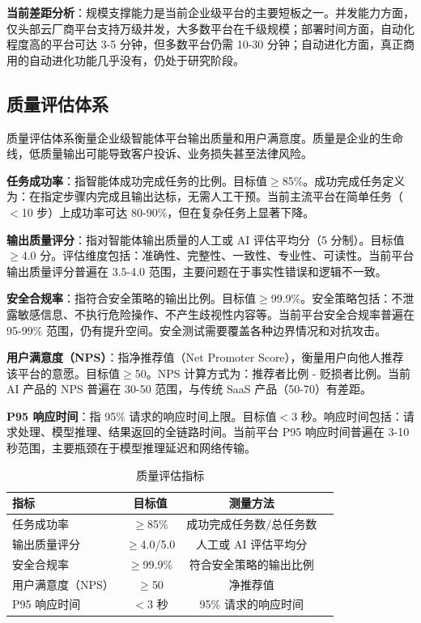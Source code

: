 \documentclass[12pt,a4paper]{article}
\begin{document}
\textbf{当前差距分析}：规模支撑能力是当前企业级平台的主要短板之一。并发能力方面，仅头部云厂商平台支持万级并发，大多数平台在千级规模；部署时间方面，自动化程度高的平台可达 3-5 分钟，但多数平台仍需 10-30 分钟；自动进化方面，真正商用的自动进化功能几乎没有，仍处于研究阶段。

\subsection{质量评估体系}

质量评估体系衡量企业级智能体平台输出质量和用户满意度。质量是企业的生命线，低质量输出可能导致客户投诉、业务损失甚至法律风险。

\textbf{任务成功率}：指智能体成功完成任务的比例。目标值$\geq$85\%。成功完成任务定义为：在指定步骤内完成且输出达标，无需人工干预。当前主流平台在简单任务（$<$10 步）上成功率可达 80-90\%，但在复杂任务上显著下降。

\textbf{输出质量评分}：指对智能体输出质量的人工或 AI 评估平均分（5 分制）。目标值$\geq$4.0 分。评估维度包括：准确性、完整性、一致性、专业性、可读性。当前平台输出质量评分普遍在 3.5-4.0 范围，主要问题在于事实性错误和逻辑不一致。

\textbf{安全合规率}：指符合安全策略的输出比例。目标值$\geq$99.9\%。安全策略包括：不泄露敏感信息、不执行危险操作、不产生歧视性内容等。当前平台安全合规率普遍在 95-99\% 范围，仍有提升空间。安全测试需要覆盖各种边界情况和对抗攻击。

\textbf{用户满意度（NPS）}：指净推荐值（Net Promoter Score），衡量用户向他人推荐该平台的意愿。目标值$\geq$50。NPS 计算方式为：推荐者比例 - 贬损者比例。当前 AI 产品的 NPS 普遍在 30-50 范围，与传统 SaaS 产品（50-70）有差距。

\textbf{P95 响应时间}：指 95\% 请求的响应时间上限。目标值$<$3 秒。响应时间包括：请求处理、模型推理、结果返回的全链路时间。当前平台 P95 响应时间普遍在 3-10 秒范围，主要瓶颈在于模型推理延迟和网络传输。

\begin{table}[h]
\centering
\caption{质量评估指标}
\label{tab:quality}
\begin{tabular}{@{}lccl@{}}
\toprule
\textbf{指标} & \textbf{目标值} & \textbf{测量方法} \\
\midrule
任务成功率 & $\geq$85\% & 成功完成任务数/总任务数 \\
输出质量评分 & $\geq$4.0/5.0 & 人工或 AI 评估平均分 \\
安全合规率 & $\geq$99.9\% & 符合安全策略的输出比例 \\
用户满意度（NPS） & $\geq$50 & 净推荐值 \\
P95 响应时间 & $<$3 秒 & 95\% 请求的响应时间 \\
\bottomrule
\end{tabular}
\end{table}
\end{document}
